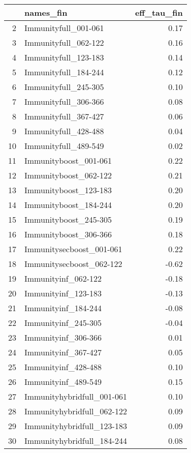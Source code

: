 \begin{table}[ht]
\centering
\begin{tabular}{rlr}
  \hline
 & names\_fin & eff\_tau\_fin \\ 
  \hline
2 & Immunityfull\_001-061 & 0.17 \\ 
  3 & Immunityfull\_062-122 & 0.16 \\ 
  4 & Immunityfull\_123-183 & 0.14 \\ 
  5 & Immunityfull\_184-244 & 0.12 \\ 
  6 & Immunityfull\_245-305 & 0.10 \\ 
  7 & Immunityfull\_306-366 & 0.08 \\ 
  8 & Immunityfull\_367-427 & 0.06 \\ 
  9 & Immunityfull\_428-488 & 0.04 \\ 
  10 & Immunityfull\_489-549 & 0.02 \\ 
  11 & Immunityboost\_001-061 & 0.22 \\ 
  12 & Immunityboost\_062-122 & 0.21 \\ 
  13 & Immunityboost\_123-183 & 0.20 \\ 
  14 & Immunityboost\_184-244 & 0.20 \\ 
  15 & Immunityboost\_245-305 & 0.19 \\ 
  16 & Immunityboost\_306-366 & 0.18 \\ 
  17 & Immunitysecboost\_001-061 & 0.22 \\ 
  18 & Immunitysecboost\_062-122 & -0.62 \\ 
  19 & Immunityinf\_062-122 & -0.18 \\ 
  20 & Immunityinf\_123-183 & -0.13 \\ 
  21 & Immunityinf\_184-244 & -0.08 \\ 
  22 & Immunityinf\_245-305 & -0.04 \\ 
  23 & Immunityinf\_306-366 & 0.01 \\ 
  24 & Immunityinf\_367-427 & 0.05 \\ 
  25 & Immunityinf\_428-488 & 0.10 \\ 
  26 & Immunityinf\_489-549 & 0.15 \\ 
  27 & Immunityhybridfull\_001-061 & 0.10 \\ 
  28 & Immunityhybridfull\_062-122 & 0.09 \\ 
  29 & Immunityhybridfull\_123-183 & 0.09 \\ 
  30 & Immunityhybridfull\_184-244 & 0.08 \\ 

\end{tabular}
\end{table}
